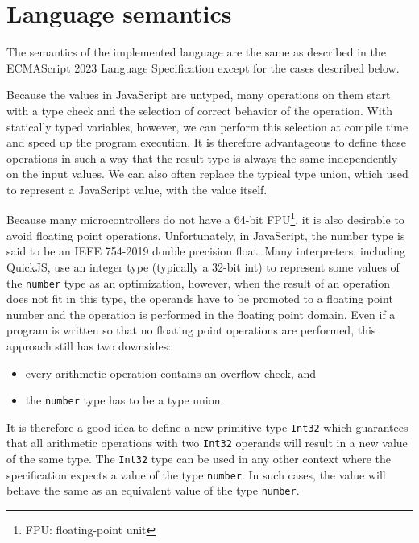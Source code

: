 \section{Language semantics}

The semantics of the implemented language are the same as described in the ECMAScript 2023 Language Specification\cite{ecma262} except for the cases described below.

Because the values in JavaScript are untyped, many operations on them start with a type check and the selection of correct behavior of the operation. With statically typed variables, however, we can perform this selection at compile time and speed up the program execution. It is therefore advantageous to define these operations in such a way that the result type is always the same independently on the input values. We can also often replace the typical type union, which used to represent a JavaScript value, with the value itself.

Because many microcontrollers do not have a 64-bit FPU\footnote{FPU: floating-point unit}, it is also desirable to avoid floating point operations. Unfortunately, in JavaScript, the number type is said to be an IEEE 754-2019 double precision float\cite{ieee754}. Many interpreters, including QuickJS, use an integer type (typically a 32-bit int) to represent some values of the \texttt{number} type as an optimization, however, when the result of an operation does not fit in this type, the operands have to be promoted to a floating point number and the operation is performed in the floating point domain. Even if a program is written so that no floating point operations are performed, this approach still has two downsides:
\begin{itemize}
    \item every arithmetic operation contains an overflow check, and
    \item the \texttt{number} type has to be a type union.
\end{itemize}

It is therefore a good idea to define a new primitive type \texttt{Int32} which guarantees that all arithmetic operations with two \texttt{Int32} operands will result in a new value of the same type. The \texttt{Int32} type can be used in any other context where the specification expects a value of the type \texttt{number}. In such cases, the value will behave the same as an equivalent value of the type \texttt{number}.

